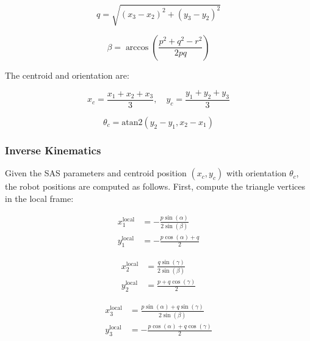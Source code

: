 \documentclass[lettersize,journal]{IEEEtran}
\begin{document}
\begin{equation}
q = \sqrt{(x_3 - x_2)^2 + (y_3 - y_2)^2}
\end{equation}


\begin{equation}
\beta = \arccos\left(\frac{p^2 + q^2 - r^2}{2pq}\right)
\end{equation}

The centroid and orientation are:

\begin{equation}
x_c = \frac{x_1 + x_2 + x_3}{3}, \quad y_c = \frac{y_1 + y_2 + y_3}{3}
\end{equation}

\begin{equation}
\theta_c = \text{atan2}(y_2 - y_1, x_2 - x_1)
\end{equation}

\subsubsection{Inverse Kinematics}

Given the SAS parameters and centroid position $(x_c, y_c)$ with orientation $\theta_c$, the robot positions are computed as follows. First, compute the triangle vertices in the local frame:

\begin{equation}
\begin{aligned}
x_1^{\text{local}} &= -\frac{p \sin(\alpha)}{2 \sin(\beta)} \\
y_1^{\text{local}} &= -\frac{p \cos(\alpha) + q}{2}
\end{aligned}
\end{equation}

\begin{equation}
\begin{aligned}
x_2^{\text{local}} &= \frac{q \sin(\gamma)}{2 \sin(\beta)} \\
y_2^{\text{local}} &= \frac{p + q \cos(\gamma)}{2}
\end{aligned}
\end{equation}

\begin{equation}
\begin{aligned}
x_3^{\text{local}} &= \frac{p \sin(\alpha) + q \sin(\gamma)}{2 \sin(\beta)} \\
y_3^{\text{local}} &= -\frac{p \cos(\alpha) + q \cos(\gamma)}{2}
\end{aligned}
\end{equation}
\end{document}
